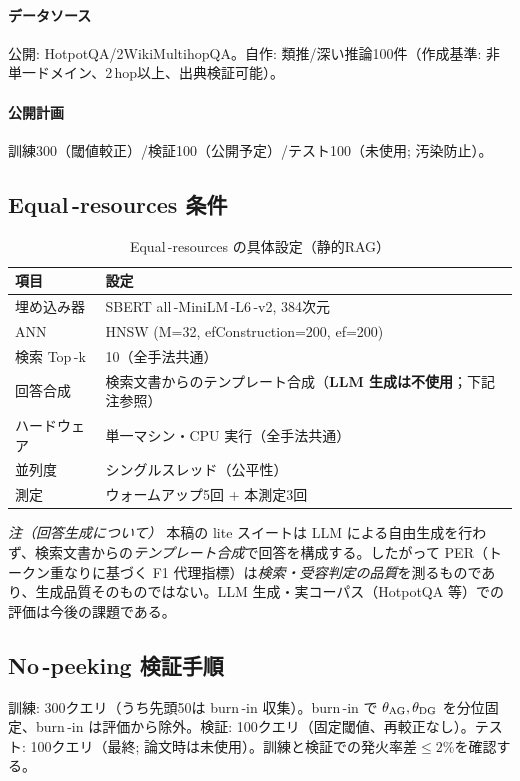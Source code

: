 \documentclass[ja=standard,xelatex]{bxjsarticle}
\begin{document}
\paragraph{データソース}\; 公開: HotpotQA/2WikiMultihopQA。自作: 類推/深い推論100件（作成基準: 非単一ドメイン、2\,hop以上、出典検証可能）。\\
\paragraph{公開計画}\; 訓練300（閾値較正）/検証100（公開予定）/テスト100（未使用; 汚染防止）。

\subsection{Equal\,\mbox{-}resources 条件}\label{sec:rag_equal_resources}
\begin{table}[H]
\centering
\caption{Equal\,\mbox{-}resources の具体設定（静的RAG）}
\begin{tabular}{ll}
\toprule
項目 & 設定 \\
\midrule
埋め込み器 & SBERT all\,\mbox{-}MiniLM\,\mbox{-}L6\,\mbox{-}v2, 384次元 \\
ANN & HNSW (M=32, efConstruction=200, ef=200) \\
検索 Top\,\mbox{-}k & 10（全手法共通） \\
回答合成 & 検索文書からのテンプレート合成（\textbf{LLM 生成は不使用}；下記注参照） \\
ハードウェア & 単一マシン・CPU 実行（全手法共通） \\
並列度 & シングルスレッド（公平性） \\
測定 & ウォームアップ5回 + 本測定3回 \\
\bottomrule
\end{tabular}
\end{table}

\noindent\textit{注（回答生成について）}\; 本稿の lite スイートは LLM による自由生成を行わず、検索文書からの\emph{テンプレート合成}で回答を構成する。したがって PER（トークン重なりに基づく F1 代理指標）は\emph{検索・受容判定の品質}を測るものであり、生成品質そのものではない。LLM 生成・実コーパス（HotpotQA 等）での評価は今後の課題である。

\subsection{No\,\mbox{-}peeking 検証手順}\label{sec:rag_no_peeking}
訓練: 300クエリ（うち先頭50は burn\,\mbox{-}in 収集）。burn\,\mbox{-}in で $\theta_{\rm AG},\theta_{\rm DG}$ を分位固定、burn\,\mbox{-}in は評価から除外。検証: 100クエリ（固定閾値、再較正なし）。テスト: 100クエリ（最終; 論文時は未使用）。訓練と検証での発火率差$\le2$\%を確認する。
\end{document}
